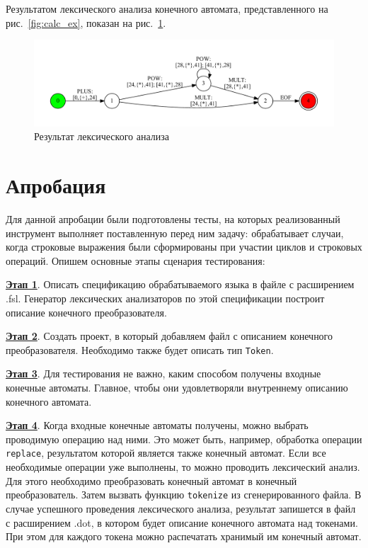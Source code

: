 \documentclass{matmex-diploma}
\begin{document}
Результатом лексического анализа конечного автомата, представленного на рис.~\ref{fig:calc_ex}, показан на рис.~\ref{fig:calc_ex_res}. 

\begin{figure}[h!]
\begin{center}
\includegraphics[width=1.0\textwidth]{calc_ex_res}
\caption{Результат лексического анализа}
\label{fig:calc_ex_res} 
\end{center}
\end{figure}


\section{Апробация}

Для данной апробации были подготовлены тесты, на которых реализованный инструмент выполняет поставленную перед ним задачу: обрабатывает случаи, когда строковые выражения были сформированы при участии циклов и строковых операций. Опишем основные этапы сценария тестирования:

\textbf{\underline{Этап 1}}. Описать спецификацию обрабатываемого языка в файле с расширением .fsl. Генератор лексических анализаторов по этой спецификации построит описание конечного преобразователя. 

\textbf{\underline{Этап 2}}. Создать проект, в который добавляем файл с описанием конечного преобразователя. Необходимо также будет описать тип \verb|Token|. 

\textbf{\underline{Этап 3}}. Для тестирования не важно, каким способом получены входные конечные автоматы. Главное, чтобы они удовлетворяли внутреннему описанию конечного автомата. 

\textbf{\underline{Этап 4}}. Когда входные конечные автоматы получены, можно выбрать проводимую операцию над ними. Это может быть, например, обработка операции \verb|replace|, результатом которой является также конечный автомат. Если все необходимые операции уже выполнены, то можно проводить лексический анализ. Для этого необходимо преобразовать конечный автомат в конечный преобразователь. Затем вызвать функцию \verb|tokenize| из сгенерированного файла. В случае успешного проведения лексического анализа, результат запишется в файл с расширением .dot, в котором будет описание конечного автомата над токенами. При этом для каждого токена можно распечатать хранимый им конечный автомат.
\end{document}
